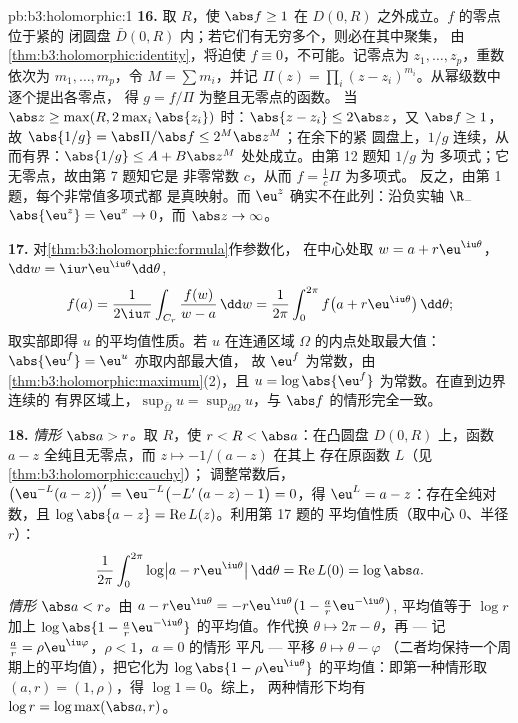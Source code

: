 \begin{solution}{pb:b3:holomorphic:1}
\textbf{16.} 取 $R$，使 $\abs f \geq 1$ 在
$D(0, R)$ 之外成立。$f$ 的零点位于紧的
闭圆盘 $\bar D(0, R)$ 内；若它们有无穷多个，则必在其中聚集，
由\cref{thm:b3:holomorphic:identity}，将迫使 $f
\equiv 0$，不可能。记零点为 $z_1, \dots, z_p$，重数依次为
$m_1, \dots, m_p$，令 $M = \sum m_i$，并记
$\Pi(z) = \prod_i(z - z_i)^{m_i}$。从幂级数中逐个提出各零点，
得 $g = f/\Pi$ 为整且无零点的函数。
当 $\abs z \geq \max(R, 2\max_i\abs{z_i})$ 时：$\abs{z - z_i}
\leq 2\abs z$，又 $\abs f \geq 1$，故 $\abs{1/g} =
\abs\Pi/\abs f \leq 2^M\abs z^M$；在余下的紧
圆盘上，$1/g$ 连续，从而有界：$\abs{1/g} \leq A +
B\abs z^M$ 处处成立。由第 12 题知 $1/g$ 为
多项式；它无零点，故由第 7 题知它是
非零常数 $c$，从而 $f = \frac1c\Pi$ 为多项式。
反之，由第 1 题，每个非常值多项式都
是真映射。而 $\eu^z$ 确实不在此列：沿负实轴 $\R_-$
$\abs{\eu^z} = \eu^x \to 0$，而 $\abs z \to \infty$。

\textbf{17.} 对\cref{thm:b3:holomorphic:formula}作参数化，
在中心处取 $w = a + r\eu^{\iu\theta}$，$\dd w = \iu
r\eu^{\iu\theta}\dd\theta$,
\[
f(a) = \frac1{2\iu\pi}\int_{C_r}\frac{f(w)}{w - a}\,\dd w
= \frac1{2\pi}\int_0^{2\pi}
f\bigl(a + r\eu^{\iu\theta}\bigr)\,\dd\theta ;
\]
取实部即得 $u$ 的平均值性质。若
$u$ 在连通区域
$\Omega$ 的内点处取最大值：$\abs{\eu^f} = \eu^u$ 亦取内部最大值，
故 $\eu^f$ 为常数，由
\cref{thm:b3:holomorphic:maximum}(2)，且 $u =
\log\abs{\eu^f}$ 为常数。在直到边界连续的
有界区域上，$\sup_{\bar\Omega}u =
\sup_{\partial\Omega}u$，与 $\abs f$ 的情形完全一致。

\textbf{18.} \emph{情形 $\abs a > r$。}取 $R$，使 $r < R
< \abs a$：在凸圆盘 $D(0, R)$ 上，函数 $a - z$
全纯且无零点，而 $z \mapsto -1/(a - z)$ 在其上
存在原函数 $L$（见\cref{thm:b3:holomorphic:cauchy}）；
调整常数后，$\bigl(\eu^{-L}(a -
z)\bigr)' = \eu^{-L}\bigl(-L'\,(a - z) - 1\bigr) = 0$，得
$\eu^L = a - z$：存在全纯对数，且
$\log\abs{a - z} = \operatorname{Re}L(z)$。利用第 17 题的
平均值性质（取中心 $0$、半径 $r$）：
\[
\frac1{2\pi}\int_0^{2\pi}
\log\bigl|a - r\eu^{\iu\theta}\bigr|\,\dd\theta
= \operatorname{Re}L(0) = \log\abs a .
\]
\emph{情形 $\abs a < r$。}由 $a - r\eu^{\iu\theta} =
-r\eu^{\iu\theta}\bigl(1 - \frac ar\eu^{-\iu\theta}\bigr)$,
平均值等于 $\log r$ 加上 $\log\abs{1 -
\frac ar\eu^{-\iu\theta}}$ 的平均值。作代换 $\theta \mapsto
2\pi - \theta$，再 --- 记 $\frac ar =
\rho\eu^{\iu\varphi}$，$\rho < 1$，$a = 0$ 的情形
平凡 --- 平移 $\theta \mapsto \theta - \varphi$
（二者均保持一个周期上的平均值），把它化为
$\log\abs{1 - \rho\eu^{\iu\theta}}$ 的平均值：即第一种情形取
$(a, r) = (1, \rho)$，得 $\log 1 = 0$。综上，
两种情形下均有 $\log r = \log\max(\abs a, r)$。


\end{solution}
